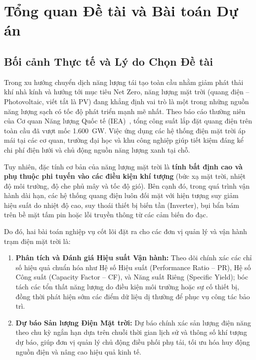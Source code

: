 \documentclass[12pt, a4paper]{report}
\begin{document}
\chapter{Tổng quan Đề tài và Bài toán Dự án}
\label{chap:tongquan}

\section{Bối cảnh Thực tế và Lý do Chọn Đề tài}
\label{sec:lydo}

Trong xu hướng chuyển dịch năng lượng tái tạo toàn cầu nhằm giảm phát thải khí nhà kính và hướng tới mục tiêu Net Zero, năng lượng mặt trời (quang điện -- Photovoltaic, viết tắt là PV) đang khẳng định vai trò là một trong những nguồn năng lượng sạch có tốc độ phát triển mạnh mẽ nhất. Theo báo cáo thường niên của Cơ quan Năng lượng Quốc tế (IEA)~\cite{iea2023pvps}, tổng công suất lắp đặt quang điện trên toàn cầu đã vượt mốc 1.600~GW. Việc ứng dụng các hệ thống điện mặt trời áp mái tại các cơ quan, trường đại học và khu công nghiệp giúp tiết kiệm đáng kể chi phí điện lưới và chủ động nguồn năng lượng xanh tại chỗ.

Tuy nhiên, đặc tính cơ bản của năng lượng mặt trời là \textbf{tính bất định cao và phụ thuộc phi tuyến vào các điều kiện khí tượng} (bức xạ mặt trời, nhiệt độ môi trường, độ che phủ mây và tốc độ gió). Bên cạnh đó, trong quá trình vận hành dài hạn, các hệ thống quang điện luôn đối mặt với hiện tượng suy giảm hiệu suất do nhiệt độ cao, suy thoái thiết bị biến tần (Inverter), bụi bẩn bám trên bề mặt tấm pin hoặc lỗi truyền thông từ các cảm biến đo đạc.

Do đó, hai bài toán nghiệp vụ cốt lõi đặt ra cho các đơn vị quản lý và vận hành trạm điện mặt trời là:
\begin{enumerate}[noitemsep]
    \item \textbf{Phân tích và Đánh giá Hiệu suất Vận hành:} Theo dõi chính xác các chỉ số hiệu quả chuẩn hóa như Hệ số Hiệu suất (Performance Ratio -- PR), Hệ số Công suất (Capacity Factor -- CF), và Năng suất Riêng (Specific Yield); bóc tách các tổn thất năng lượng do điều kiện môi trường hoặc sự cố thiết bị, đồng thời phát hiện sớm các điểm dữ liệu dị thường để phục vụ công tác bảo trì.
    \item \textbf{Dự báo Sản lượng Điện Mặt trời:} Dự báo chính xác sản lượng điện năng theo chu kỳ ngắn hạn dựa trên chuỗi thời gian lịch sử và thông số khí tượng dự báo, giúp đơn vị quản lý chủ động điều phối phụ tải, tối ưu hóa huy động nguồn điện và nâng cao hiệu quả kinh tế.
\end{enumerate}
\end{document}

